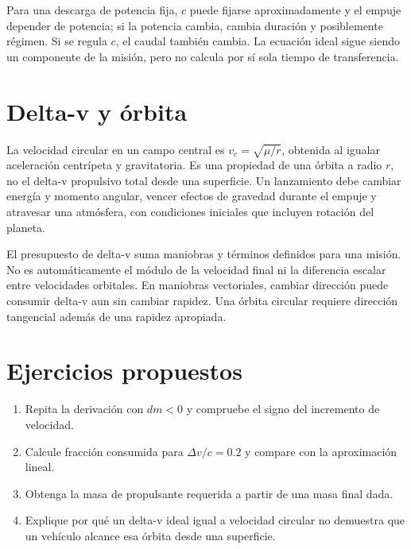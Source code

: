 Para una descarga de potencia fija, $c$ puede fijarse aproximadamente y el empuje depender de potencia; si la potencia cambia, cambia duración y posiblemente régimen. Si se regula $c$, el caudal también cambia. La ecuación ideal sigue siendo un componente de la misión, pero no calcula por sí sola tiempo de transferencia.
\section{Delta-v y órbita}
La velocidad circular en un campo central es $v_c=\sqrt{\mu/r}$, obtenida al igualar aceleración centrípeta y gravitatoria. Es una propiedad de una órbita a radio $r$, no el delta-v propulsivo total desde una superficie. Un lanzamiento debe cambiar energía y momento angular, vencer efectos de gravedad durante el empuje y atravesar una atmósfera, con condiciones iniciales que incluyen rotación del planeta.

El presupuesto de delta-v suma maniobras y términos definidos para una misión. No es automáticamente el módulo de la velocidad final ni la diferencia escalar entre velocidades orbitales. En maniobras vectoriales, cambiar dirección puede consumir delta-v aun sin cambiar rapidez. Una órbita circular requiere dirección tangencial además de una rapidez apropiada.
\section{Ejercicios propuestos}
\begin{enumerate}
\item Repita la derivación con $dm<0$ y compruebe el signo del incremento de velocidad.
\item Calcule fracción consumida para $\Delta v/c=0.2$ y compare con la aproximación lineal.
\item Obtenga la masa de propulsante requerida a partir de una masa final dada.
\item Explique por qué un delta-v ideal igual a velocidad circular no demuestra que un vehículo alcance esa órbita desde una superficie.
\end{enumerate}
